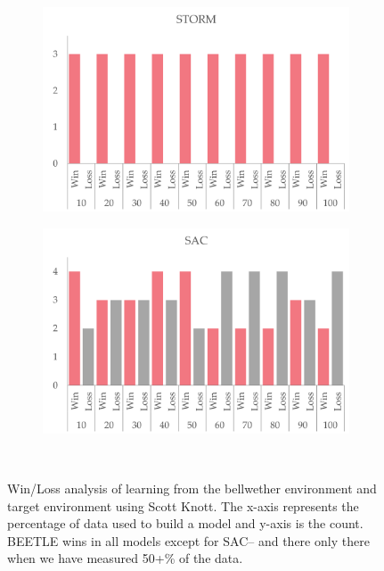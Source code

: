 \begin{figure}[t]
\begin{subfigure}[t]{0.33\linewidth}
\end{subfigure}\\[0.25cm]
\begin{subfigure}[t]{0.33\linewidth}
		\centering
		\includegraphics[width=\linewidth]{figures/storm_rq2.png}
\end{subfigure}\hspace{12pt}
\begin{subfigure}[t]{0.33\linewidth}
		\centering
		\includegraphics[width=\linewidth]{figures/sac_rq2.png}
\end{subfigure}\\[0.25cm]
	\caption{{\small Win/Loss analysis of learning from the bellwether environment and target environment using Scott Knott. The x-axis represents the percentage of data used to build a model and y-axis is the count.
	BEETLE wins in all models except for SAC-- and there only there when we have measured 50+\% of the data.}}
	\label{fig:rq2_1}
\end{figure}
